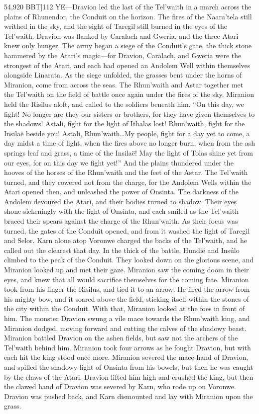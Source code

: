 \documentclass[smalldemyvopaper,11pt,twoside,onecolumn,openright,extrafontsizes]{memoir}
\begin{document}
{{54,920 BBT|112 YE—Dravion led the last of the Tel’waith in a march across the plains of Rhunendor, the Conduit on the horizon. The fires of the Naara’tela still writhed in the sky, and the sight of Taregil still burned in the eyes of the Tel’waith. Dravion was flanked by Caralach and Gweria, and the three Atari knew only hunger. The army began a siege of the Conduit’s gate, the thick stone hammered by the Atari’s magic—for Dravion, Caralach, and Gweria were the strongest of the Atari, and each had opened an Andolem Well within themselves alongside Linarata. As the siege unfolded, the grasses bent under the horns of Miranion, come from across the seas. The Rhun’waith and Astar together met the Tel’waith on the field of battle once again under the fires of the sky. Miranion held the Risilus aloft, and called to the soldiers beneath him.
	“On this day, we fight! No longer are they our sisters or brothers, for they have given themselves to the shadows! Astali, fight for the light of Ithalas lost! Rhun’waith, fight for the Insilaë beside you! Astali, Rhun’waith…My people, fight for a day yet to come, a day midst a time of light, when the fires above no longer burn, when from the ash springs leaf and grass, a time of the Insilaë! May the light of Tolas shine yet from our eyes, for on this day we fight yet!”
	And the plains thundered under the hooves of the horses of the Rhun’waith and the feet of the Astar. The Tel’waith turned, and they cowered not from the charge, for the Andolem Wells within the Atari opened then, and unleashed the power of Onsinta. The darkness of the Andolem devoured the Atari, and their bodies turned to shadow. Their eyes shone sickeningly with the light of Onsinta, and each smiled as the Tel’waith braced their spears against the charge of the Rhun’waith. As their focus was turned, the gates of the Conduit opened, and from it washed the light of Taregil and Selor. Karn alone atop Voronwe charged the backs of the Tel’waith, and he called out the clearest that day.
	In the thick of the battle, Hundië and Insúlo climbed to the peak of the Conduit. They looked down on the glorious scene, and Miranion looked up and met their gaze. Miranion saw the coming doom in their eyes, and knew that all would sacrifice themselves for the coming fate. Miranion took from his finger the Risilus, and tied it to an arrow. He fired the arrow from his mighty bow, and it soared above the field, sticking itself within the stones of the city within the Conduit. With that, Miranion looked at the foes in front of him. The monster Dravion swung a vile mace towards the Rhun’waith king, and Miranion dodged, moving forward and cutting the calves of the shadowy beast. Miranion battled Dravion on the ashen fields, but saw not the archers of the Tel’waith behind him. Miranion took four arrows as he fought Dravion, but with each hit the king stood once more. Miranion severed the mace-hand of Dravion, and spilled the shadowy-light of Onsinta from his bowels, but then he was caught by the claws of the Atari. Dravion lifted him high and crushed the king, but then the clawed hand of Dravion was severed by Karn, who rode up on Voronwe. Dravion was pushed back, and Karn dismounted and lay with Miranion upon the grass.
}}
\end{document}
